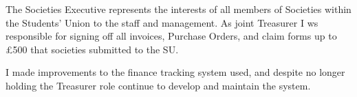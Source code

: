 The Societies Executive represents the interests of all members of Societies within the Students' Union to the staff and management.
As joint Treasurer I ws responsible for signing off all invoices, Purchase Orders, and claim forms up to £500 that societies submitted to the SU.

I made improvements to the finance tracking system used, and despite no longer holding the Treasurer role continue to develop and maintain the system.
\sectionsep{}
